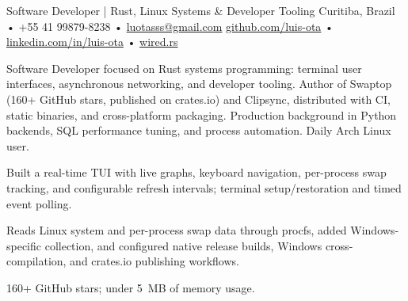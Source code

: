 




\cvheader
  {Software Developer | Rust, Linux Systems \& Developer Tooling}
  {Curitiba, Brazil • +55 41 99879-8238 • \href{mailto:luotasss@gmail.com}{luotasss@gmail.com}}
  {\href{https://github.com/luis-ota}{github.com/luis-ota} • \href{https://linkedin.com/in/luis-ota}{linkedin.com/in/luis-ota} • \href{https://wired.rs}{wired.rs}}

Software Developer focused on Rust systems programming: terminal user interfaces, asynchronous networking, and developer tooling. Author of Swaptop (160+ GitHub stars, published on crates.io) and Clipsync, distributed with CI, static binaries, and cross-platform packaging. Production background in Python backends, SQL performance tuning, and process automation. Daily Arch Linux user.



\begin{cvbullets}
  \item Built a real-time TUI with live graphs, keyboard navigation, per-process swap tracking, and configurable refresh intervals; terminal setup/restoration and timed event polling.
  \item Reads Linux system and per-process swap data through procfs, added Windows-specific collection, and configured native release builds, Windows cross-compilation, and crates.io publishing workflows.
  \item 160+ GitHub stars; under 5~MB of memory usage.
\end{cvbullets}

